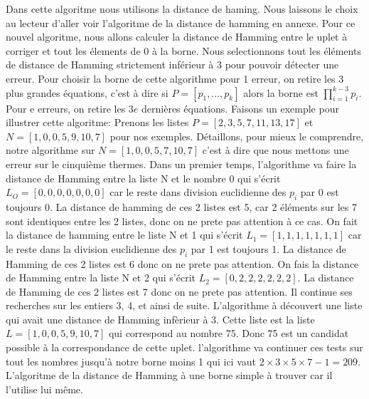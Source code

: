 \documentclass[a4paper, 11pt]{report}
\begin{document}
Dans cette algoritme nous utilisons la distance de haming. Nous laissons le choix au lecteur d'aller voir l'algoritme de la distance de hamming en annexe.\newline
Pour ce nouvel algoritme, nous allons calculer la distance de Hamming entre le uplet à corriger et tout les élements de 0 à la borne. Nous selectionnons tout les éléments de distance de Hamming strictement inférieur à 3 pour pouvoir détecter une erreur. \newline
Pour choisir la borne de cette algorithme pour 1 erreur, on retire les 3 plus grandes équations, c'est à dire si $P=[p_1, ..., p_k]$ alors la borne est $\prod_{i=1} ^{k-3} p_i$. Pour e erreurs, on retire les $3e$ dernières équations. \newline
Faisons un exemple pour illustrer cette algoritme: \newline
Prenons les listes $P=[2,3,5,7,11,13,17]$ et $N=[1,0,0,5,9,10,7]$ pour nos exemples. \newline
Détaillons, pour mieux le comprendre, notre algorithme sur $N=[1,0,0,5,7,10,7]$ c'est à dire que nous mettons une erreur sur le cinquième thermes.
Dans un premier temps, l'algorithme va faire la distance de Hamming entre la liste N et le nombre 0 qui s'écrit $L_O=[0,0,0,0,0,0,0]$ car le reste dans division euclidienne des $p_i$ par 0 est toujours 0.
La distance de hamming de ces 2 listes est 5, car 2 éléments sur les 7 sont identiques entre les 2 listes, donc on ne prete pas attention à ce cas. \newline
On fait la distance de hamming entre le liste N et 1 qui s'écrit $L_1=[1,1,1,1,1,1,1]$ car le reste dans la division euclidienne des $p_i$ par 1 est toujours 1.
La distance de Hamming de ces 2 listes est 6 donc on ne prete pas attention.
On fais la distance de Hamming entre la liste N et 2 qui s'écrit $L_2=[0,2,2,2,2,2,2]$. La distance de Hamming de ces 2 listes est 7 donc on ne prete pas attention. \newline
Il continue ses recherches sur les entiers 3, 4, et ainsi de suite. L'algorithme à découvert une liste qui avait une distance de Hamming infèrieur à 3. Cette liste est la liste $L=[1,0,0,5,9,10,7]$ qui correspond au nombre 75. Donc 75 est un candidat possible à la correspondance de cette uplet.
l'algorithme va continuer ces tests sur tout les nombres jusqu'à notre borne moins 1 qui ici vaut $2\times 3\times 5\times 7 -1=209$. \newline
\newline
L'algoritme de la distance de Hamming à une borne simple à trouver car il l'utilise lui même. \newline
\end{document}
